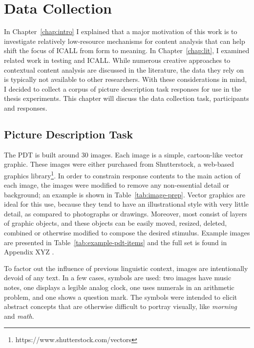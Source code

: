 \chapter{Data Collection}
\label{chap:data}

In Chapter~\ref{chap:intro} I explained that a major motivation of this work is to investigate relatively low-resource mechanisms for content analysis that can help shift the focus of ICALL from form to meaning. In Chapter~\ref{chap:lit}, I examined related work in testing and ICALL. While numerous creative approaches to contextual content analysis are discussed in the literature, the data they rely on is typically not available to other researchers. With these considerations in mind, I decided to collect a corpus of picture description task responses for use in the thesis experiments. This chapter will discuss the data collection task, participants and responses.

\section{Picture Description Task}
\label{sec:pdt}


The PDT is built around 30 images. Each image is a simple, cartoon-like vector graphic. These images were either purchased from Shutterstock, a web-based graphics library\footnote{https://www.shutterstock.com/vectors}. In order to constrain response contents to the main action of each image, the images were modified to remove any non-essential detail or background; an example is shown in Table~\ref{tab:image-prep}. Vector graphics are ideal for this use, because they tend to have an illustrational style with very little detail, as compared to photographs or drawings. Moreover, most consist of layers of graphic objects, and these objects can be easily moved, resized, deleted, combined or otherwise modified to compose the desired stimulus. Example images are presented in Table~\ref{tab:example-pdt-items} and the full set is found in Appendix XYZ .

To factor out the influence of previous linguistic context, images are intentionally devoid of any text. In a few cases, symbols are used: two images have music notes, one displays a legible analog clock, one uses numerals in an arithmetic problem, and one shows a question mark. The symbols were intended to elicit abstract concepts that are otherwise difficult to portray visually, like \textit{morning} and \textit{math}. 

